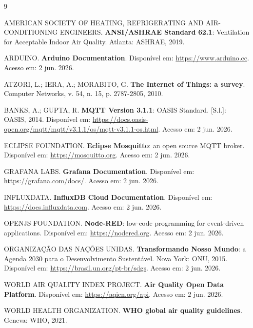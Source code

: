 \documentclass[12pt,a4paper]{article}
\begin{document}
\begin{thebibliography}{9}

AMERICAN SOCIETY OF HEATING, REFRIGERATING AND AIR-CONDITIONING ENGINEERS.
\textbf{ANSI/ASHRAE Standard 62.1}: Ventilation for Acceptable Indoor Air Quality. Atlanta: ASHRAE, 2019.

ARDUINO. \textbf{Arduino Documentation}. Disponível em: \url{https://www.arduino.cc}. Acesso em: 2 jun. 2026.

ATZORI, L.; IERA, A.; MORABITO, G. \textbf{The Internet of Things: a survey}. Computer Networks, v. 54,
n. 15, p. 2787-2805, 2010.

BANKS, A.; GUPTA, R. \textbf{MQTT Version 3.1.1}: OASIS Standard. [S.l.]: OASIS, 2014. Disponível em:
\url{https://docs.oasis-open.org/mqtt/mqtt/v3.1.1/os/mqtt-v3.1.1-os.html}. Acesso em: 2 jun. 2026.

ECLIPSE FOUNDATION. \textbf{Eclipse Mosquitto}: an open source MQTT broker. Disponível em:
\url{https://mosquitto.org}. Acesso em: 2 jun. 2026.

GRAFANA LABS. \textbf{Grafana Documentation}. Disponível em: \url{https://grafana.com/docs/}.
Acesso em: 2 jun. 2026.

INFLUXDATA. \textbf{InfluxDB Cloud Documentation}. Disponível em: \url{https://docs.influxdata.com}.
Acesso em: 2 jun. 2026.

OPENJS FOUNDATION. \textbf{Node-RED}: low-code programming for event-driven applications. Disponível em:
\url{https://nodered.org}. Acesso em: 2 jun. 2026.

ORGANIZAÇÃO DAS NAÇÕES UNIDAS. \textbf{Transformando Nosso Mundo}: a Agenda 2030 para o Desenvolvimento
Sustentável. Nova York: ONU, 2015. Disponível em: \url{https://brasil.un.org/pt-br/sdgs}.
Acesso em: 2 jun. 2026.

WORLD AIR QUALITY INDEX PROJECT. \textbf{Air Quality Open Data Platform}. Disponível em:
\url{https://aqicn.org/api}. Acesso em: 2 jun. 2026.

WORLD HEALTH ORGANIZATION. \textbf{WHO global air quality guidelines}. Geneva: WHO, 2021.

\end{thebibliography}
\end{document}
